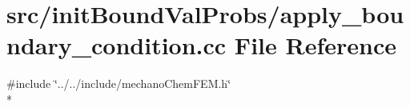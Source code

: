 \section{src/init\-Bound\-Val\-Probs/apply\-\_\-boundary\-\_\-condition.cc File Reference}
\label{apply__boundary__condition_8cc}
{\ttfamily \#include \char`\"{}../../include/mechano\-Chem\-F\-E\-M.\-h\char`\"{}}\\*
